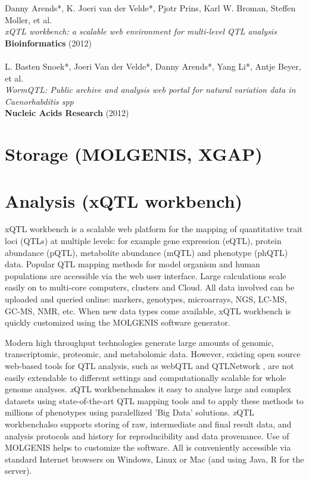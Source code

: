\documentclass[8pt, twoside, a5paper]{report}
\newenvironment{myexampleblock}[1]{%
    \tcolorbox[beamer,%
    noparskip,breakable,
    colback=LightGreen,colframe=DarkGreen,%
    colbacklower=LimeGreen!75!LightGreen,%
    title=#1]}%
    {\endtcolorbox}
\newcommand{\authors}[1]{\small{#1}}
\newcommand{\bold}[1]{{\bfseries #1}}
\newcommand{\xqtlwb}{{\it x}QTL workbench}
\begin{document}
\null
\vfill

\begin{myexampleblock}{Originally published as:}
  \authors{Danny Arends*, K. Joeri van der Velde*, Pjotr Prins, Karl W. Broman, Steffen Moller, et al.}\\
  \emph{xQTL workbench: a scalable web environment for multi-level QTL analysis}\\
  \bold{Bioinformatics} (2012)\\\\

  \authors{L. Basten Snoek*, Joeri Van der Velde*, Danny Arends*, Yang Li*, Antje Beyer, et al.}\\
  \emph{WormQTL: Public archive and analysis web portal for natural variation data in Caenorhabditis spp}\\
  \bold{Nucleic Acids Research} (2012)
\end{myexampleblock}

\newpage

\section{Storage (MOLGENIS, XGAP)}
\lipsum

\section{Analysis (xQTL workbench)}
xQTL workbench is a scalable web platform for the mapping of quantitative trait loci (QTLs) at multiple levels: 
for example gene expression (eQTL), protein abundance (pQTL), metabolite abundance (mQTL) and phenotype (phQTL) data. 
Popular QTL mapping methods for model organism and human populations are accessible via the web user interface. 
Large calculations scale easily on to multi-core computers, clusters and Cloud. All data involved can be uploaded 
and queried online: markers, genotypes, microarrays, NGS, LC-MS, GC-MS, NMR, etc. When new data types come available, 
xQTL workbench is quickly customized using the MOLGENIS software generator.

Modern high throughput technologies generate large amounts of genomic, transcriptomic, proteomic, and metabolomic 
data. However, existing open source web-based tools for QTL analysis, such as webQTL\cite{Wang:2003} and 
QTLNetwork \cite{Yang:2008}, are not easily extendable to different settings and computationally scalable 
for whole genome analyses. \xqtlwb makes it easy to analyse large and complex datasets using state-of-the-art QTL 
mapping tools and to apply these methods to millions of phenotypes using paralellized 'Big Data' 
solutions\cite{Trelles:2011}. \xqtlwb also supports storing of raw, intermediate and final result data, and 
analysis protocols and history for reproducibility and data provenance. Use of MOLGENIS\cite{Swertz:2010b} 
helps to customize the software. All is conveniently accessible via standard Internet browsers on Windows, 
Linux or Mac (and using Java, R for the server).
\end{document}
